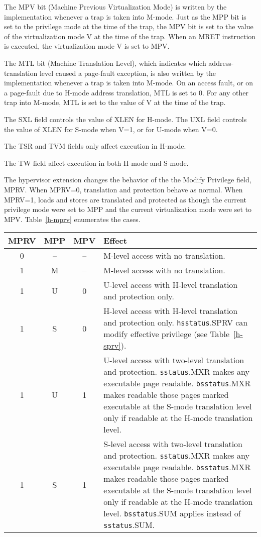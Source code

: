 The MPV bit (Machine Previous Virtualization Mode) is written by the implementation
whenever a trap is taken into M-mode.  Just as the MPP bit is set to the privilege
mode at the time of the trap, the MPV bit is set to the value of the virtualization
mode V at the time of the trap.  When an MRET instruction is executed, the
virtualization mode V is set to MPV.

The MTL bit (Machine Translation Level), which indicates which address-translation level
caused a page-fault exception, is also written by the implementation whenever a trap
is taken into M-mode.  On an access fault, or on a page-fault due to H-mode address
translation, MTL is set to 0.  For any other trap into M-mode, MTL is set to the value
of V at the time of the trap.

The SXL field controls the value of XLEN for H-mode.
The UXL field controls the value of XLEN for S-mode when V=1, or for U-mode when V=0.

The TSR and TVM fields only affect execution in H-mode.

The TW field affect execution in both H-mode and S-mode.

The hypervisor extension changes the behavior of the the Modify Privilege
field, MPRV.  When MPRV=0, translation and protection behave as normal.  When
MPRV=1, loads and stores are translated and protected as though the current
privilege mode were set to MPP and the current virtualization mode were set to
MPV.  Table~\ref{h-mprv} enumerates the cases.

\begin{table*}[h!]
\begin{center}
\begin{tabular}{|c|c|c||p{5in}|}
  \hline
   MPRV & MPP & MPV & Effect \\ \hline \hline
   0    & --  & -- & M-level access with no translation. \\ \hline
   1    & M   & -- & M-level access with no translation. \\ \hline
   1    & U   & 0  & U-level access with H-level translation and protection only. \\ \hline
   1    & S   & 0  & H-level access with H-level translation and protection only.  {\tt hsstatus}.SPRV can modify effective privilege (see Table~\ref{h-sprv}). \\ \hline
   1    & U   & 1  & U-level access with two-level translation and protection. {\tt sstatus}.MXR makes any executable page readable.  {\tt bsstatus}.MXR makes readable those pages marked executable at the S-mode translation level only if readable at the H-mode translation level. \\ \hline
   1    & S   & 1  & S-level access with two-level translation and protection. {\tt sstatus}.MXR makes any executable page readable.  {\tt bsstatus}.MXR makes readable those pages marked executable at the S-mode translation level only if readable at the H-mode translation level. {\tt bsstatus}.SUM applies instead of {\tt sstatus}.SUM. \\ \hline
 \end{tabular}
\end{center}
\caption{Effect on load and store translation and protection under MPRV.}
\label{h-mprv}
\end{table*}
